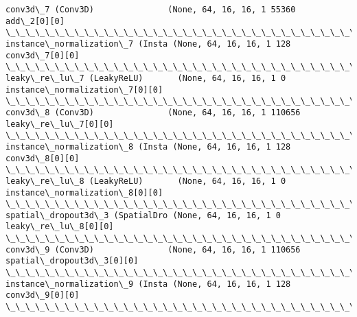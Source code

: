 \documentclass[11pt]{article}
\begin{document}
\begin{Verbatim}[commandchars=\\\{\}]
conv3d\_7 (Conv3D)               (None, 64, 16, 16, 1 55360       add\_2[0][0]                      
\_\_\_\_\_\_\_\_\_\_\_\_\_\_\_\_\_\_\_\_\_\_\_\_\_\_\_\_\_\_\_\_\_\_\_\_\_\_\_\_\_\_\_\_\_\_\_\_\_\_\_\_\_\_\_\_\_\_\_\_\_\_\_\_\_\_\_\_\_\_\_\_\_\_\_\_\_\_\_\_\_\_\_\_\_\_\_\_\_\_\_\_\_\_\_\_\_\_
instance\_normalization\_7 (Insta (None, 64, 16, 16, 1 128         conv3d\_7[0][0]                   
\_\_\_\_\_\_\_\_\_\_\_\_\_\_\_\_\_\_\_\_\_\_\_\_\_\_\_\_\_\_\_\_\_\_\_\_\_\_\_\_\_\_\_\_\_\_\_\_\_\_\_\_\_\_\_\_\_\_\_\_\_\_\_\_\_\_\_\_\_\_\_\_\_\_\_\_\_\_\_\_\_\_\_\_\_\_\_\_\_\_\_\_\_\_\_\_\_\_
leaky\_re\_lu\_7 (LeakyReLU)       (None, 64, 16, 16, 1 0           instance\_normalization\_7[0][0]   
\_\_\_\_\_\_\_\_\_\_\_\_\_\_\_\_\_\_\_\_\_\_\_\_\_\_\_\_\_\_\_\_\_\_\_\_\_\_\_\_\_\_\_\_\_\_\_\_\_\_\_\_\_\_\_\_\_\_\_\_\_\_\_\_\_\_\_\_\_\_\_\_\_\_\_\_\_\_\_\_\_\_\_\_\_\_\_\_\_\_\_\_\_\_\_\_\_\_
conv3d\_8 (Conv3D)               (None, 64, 16, 16, 1 110656      leaky\_re\_lu\_7[0][0]              
\_\_\_\_\_\_\_\_\_\_\_\_\_\_\_\_\_\_\_\_\_\_\_\_\_\_\_\_\_\_\_\_\_\_\_\_\_\_\_\_\_\_\_\_\_\_\_\_\_\_\_\_\_\_\_\_\_\_\_\_\_\_\_\_\_\_\_\_\_\_\_\_\_\_\_\_\_\_\_\_\_\_\_\_\_\_\_\_\_\_\_\_\_\_\_\_\_\_
instance\_normalization\_8 (Insta (None, 64, 16, 16, 1 128         conv3d\_8[0][0]                   
\_\_\_\_\_\_\_\_\_\_\_\_\_\_\_\_\_\_\_\_\_\_\_\_\_\_\_\_\_\_\_\_\_\_\_\_\_\_\_\_\_\_\_\_\_\_\_\_\_\_\_\_\_\_\_\_\_\_\_\_\_\_\_\_\_\_\_\_\_\_\_\_\_\_\_\_\_\_\_\_\_\_\_\_\_\_\_\_\_\_\_\_\_\_\_\_\_\_
leaky\_re\_lu\_8 (LeakyReLU)       (None, 64, 16, 16, 1 0           instance\_normalization\_8[0][0]   
\_\_\_\_\_\_\_\_\_\_\_\_\_\_\_\_\_\_\_\_\_\_\_\_\_\_\_\_\_\_\_\_\_\_\_\_\_\_\_\_\_\_\_\_\_\_\_\_\_\_\_\_\_\_\_\_\_\_\_\_\_\_\_\_\_\_\_\_\_\_\_\_\_\_\_\_\_\_\_\_\_\_\_\_\_\_\_\_\_\_\_\_\_\_\_\_\_\_
spatial\_dropout3d\_3 (SpatialDro (None, 64, 16, 16, 1 0           leaky\_re\_lu\_8[0][0]              
\_\_\_\_\_\_\_\_\_\_\_\_\_\_\_\_\_\_\_\_\_\_\_\_\_\_\_\_\_\_\_\_\_\_\_\_\_\_\_\_\_\_\_\_\_\_\_\_\_\_\_\_\_\_\_\_\_\_\_\_\_\_\_\_\_\_\_\_\_\_\_\_\_\_\_\_\_\_\_\_\_\_\_\_\_\_\_\_\_\_\_\_\_\_\_\_\_\_
conv3d\_9 (Conv3D)               (None, 64, 16, 16, 1 110656      spatial\_dropout3d\_3[0][0]        
\_\_\_\_\_\_\_\_\_\_\_\_\_\_\_\_\_\_\_\_\_\_\_\_\_\_\_\_\_\_\_\_\_\_\_\_\_\_\_\_\_\_\_\_\_\_\_\_\_\_\_\_\_\_\_\_\_\_\_\_\_\_\_\_\_\_\_\_\_\_\_\_\_\_\_\_\_\_\_\_\_\_\_\_\_\_\_\_\_\_\_\_\_\_\_\_\_\_
instance\_normalization\_9 (Insta (None, 64, 16, 16, 1 128         conv3d\_9[0][0]                   
\_\_\_\_\_\_\_\_\_\_\_\_\_\_\_\_\_\_\_\_\_\_\_\_\_\_\_\_\_\_\_\_\_\_\_\_\_\_\_\_\_\_\_\_\_\_\_\_\_\_\_\_\_\_\_\_\_\_\_\_\_\_\_\_\_\_\_\_\_\_\_\_\_\_\_\_\_\_\_\_\_\_\_\_\_\_\_\_\_\_\_\_\_\_\_\_\_\_

\end{Verbatim}
\end{document}
